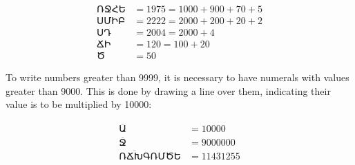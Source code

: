 \begin{align*}
\text{ՌՋՀԵ} &= 1975 = 1000 + 900 + 70 + 5\\
\text{ՍՄԻԲ} &= 2222 = 2000 + 200 + 20 + 2\\
\text{ՍԴ}   &= 2004 = 2000 + 4\\
\text{ՃԻ}   &= 120 = 100 + 20\\
\text{Ծ}    &= 50
\end{align*}

To write numbers greater than 9999, it is necessary to have numerals with values greater than 9000. This is done by drawing a line over them, indicating their value is to be multiplied by 10000:

\begin{align*}
\overline{\text{Ա}} &= 10000\\
\overline{\text{Ջ}} &= 9000000\\
\overline{\text{ՌՃԽԳ}}\text{ՌՄԾԵ} &= 11431255
\end{align*}
\egroup